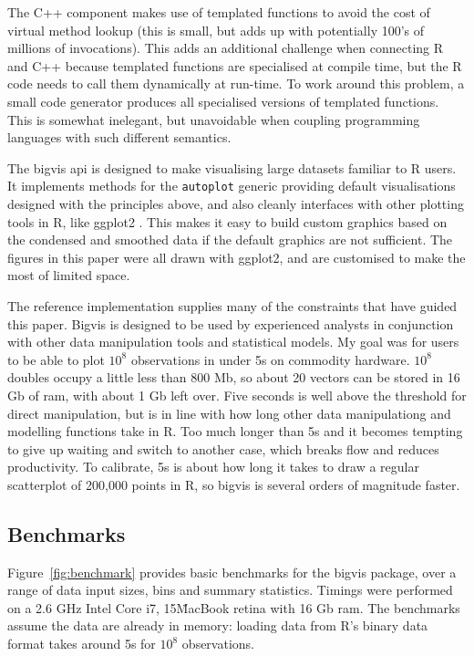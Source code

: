 \documentclass[journal]{vgtc}                %
\begin{document}
The C++ component makes use of templated functions to avoid the cost of virtual method lookup (this is small, but adds up with potentially 100's of millions of invocations). This adds an additional challenge when connecting R and C++ because templated functions are specialised at compile time, but the R code needs to call them dynamically at run-time. To work around this problem, a small code generator produces all specialised versions of templated functions. This is somewhat inelegant, but unavoidable when coupling programming languages with such different semantics.

The bigvis {\sc api} is designed to make visualising large datasets familiar to R users. It implements methods for the {\tt autoplot} generic providing default visualisations designed with the principles above, and also cleanly interfaces with other plotting tools in R, like ggplot2 \citep{me:ggplot2,wickham:2007d}. This makes it easy to build custom graphics based on the condensed and smoothed data if the default graphics are not sufficient. The figures in this paper were all drawn with ggplot2, and are customised to make the most of limited space.

The reference implementation supplies many of the constraints that have guided this paper. Bigvis is designed to be used by experienced analysts in conjunction with other data manipulation tools and statistical models. My goal was for users to be able to plot $10^8$ observations in under 5s on commodity hardware. $10^8$ doubles occupy a little less than 800 Mb, so about 20 vectors can be stored in 16 Gb of ram, with about 1 Gb left over. Five seconds is well above the threshold for direct manipulation, but is in line with how long other data manipulationg and modelling functions take in R. Too much longer than 5s and it becomes tempting to give up waiting and switch to another case, which breaks flow and reduces productivity. To calibrate, 5s is about how long it takes to draw a regular scatterplot of 200,000 points in R, so bigvis is several orders of magnitude faster.

\subsection{Benchmarks}
\label{sub:benchmarks}

Figure~\ref{fig:benchmark} provides basic benchmarks for the bigvis package, over a range of data input sizes, bins and summary statistics. Timings were performed on a 2.6 GHz Intel Core i7, 15\" MacBook retina with 16 Gb ram. The benchmarks assume the data are already in memory: loading data from R's binary data format takes around 5s for $10^8$ observations.
\end{document}
